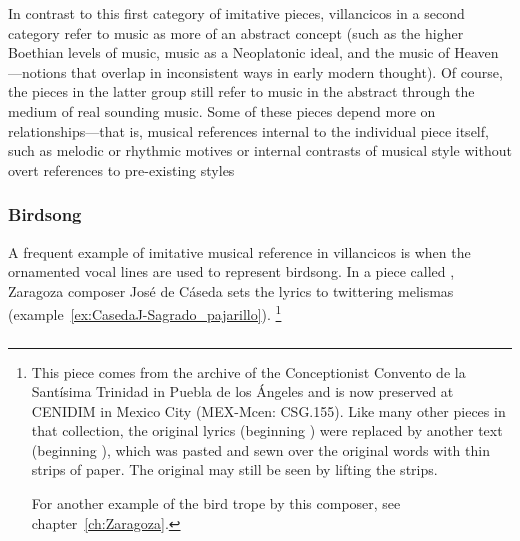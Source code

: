 In contrast to this first category of imitative pieces, villancicos in a second category refer to music as more of an abstract concept (such as the higher Boethian levels of music, music as a Neoplatonic ideal, and the music of Heaven---notions that overlap in inconsistent ways in early modern thought).
Of course, the pieces in the latter group still refer to music in the abstract through the medium of real sounding music.
Some of these pieces depend more on  relationships---that is, musical references internal to the individual piece itself, such as melodic or rhythmic motives or internal contrasts of musical style without overt references to pre-existing styles 


\subsubsection{Birdsong}

A frequent example of imitative musical reference in villancicos is when the ornamented vocal lines are used to represent birdsong.
In a piece called  , Zaragoza composer José de Cáseda sets the lyrics   to twittering melismas (example~\ref{ex:CasedaJ-Sagrado_pajarillo}).%
	\footnote{%
This piece comes from the archive of the Conceptionist Convento de la Santísima Trinidad in Puebla de los Ángeles and is now preserved at CENIDIM in Mexico City (MEX-Mcen: CSG.155).
Like many other pieces in that collection, the original lyrics (beginning ) were replaced by another text (beginning ), which was pasted and sewn over the original words with thin strips of paper.
The original may still be seen by lifting the strips.

For another example of the bird trope by this composer, see chapter~\ref{ch:Zaragoza}.
	}
% 
% 
\subsubsection{}

